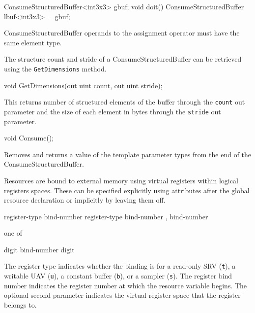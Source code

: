 \begin{HLSL}
  ConsumeStructuredBuffer<int3x3> gbuf;
  void doit() {
    ConsumeStructuredBuffer lbuf<int3x3> = gbuf;
  }
\end{HLSL}
ConsumeStructuredBuffer operands to the assignment operator must have the same element type.


The structure count and stride of a ConsumeStructuredBuffer can be retrieved using the \texttt{GetDimensions} method.
\begin{HLSL}
void GetDimensions(out uint count, out uint stride);
\end{HLSL}

This returns number of structured elements of the buffer through the \texttt{count} out parameter
and the size of each element in bytes through the \texttt{stride} out parameter.


\begin{HLSL}
   void Consume();
\end{HLSL}

Removes and returns a value of the template parameter types from the end of the ConsumeStructuredBuffer.





Resources are bound to external memory using virtual registers within logical registers spaces.
These can be specified explicitly using attributes after the global resource declaration
or implicitly by leaving them off.

\begin{grammar}
  \br
   register-type bind-number \terminal{)}\br
   register-type bind-number ,  bind-number \terminal{)}\br

   \textnormal{one of}\br
  \br

  \br
  digit\br
  bind-number digit\br
\end{grammar}

The register type indicates whether the binding is for a read-only SRV (\texttt{t}), a writable UAV (\texttt{u}),
a constant buffer (\texttt{b}), or a sampler (\texttt{s}).
The register bind number indicates the register number at which the resource variable begins.
The optional second parameter indicates the virtual register space that the register belongs to.

